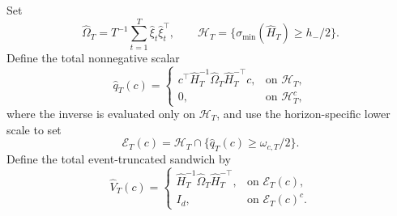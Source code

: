 Set
\[
 \widehat\Omega_T=T^{-1}\sum_{t=1}^T\widehat\xi_t\widehat\xi_t^\top,
 \qquad
 \mathcal H_T=\{\sigma_{\min}(\widehat H_T)\ge h_-/2\}.
\]
Define the total nonnegative scalar
\[
 \widehat q_T(c)=
 \begin{cases}
 c^\top\widehat H_T^{-1}\widehat\Omega_T\widehat H_T^{-\top}c,
   &\text{on }\mathcal H_T,\\
 0,&\text{on }\mathcal H_T^c,
 \end{cases}
\]
where the inverse is evaluated only on \(\mathcal H_T\), and use the horizon-specific lower scale to set
\[
 \mathcal E_T(c)=\mathcal H_T\cap\{\widehat q_T(c)\ge\omega_{c,T}/2\}.
\]
Define the total event-truncated sandwich by
\[
 \widehat V_T(c)=
 \begin{cases}
 \widehat H_T^{-1}\widehat\Omega_T\widehat H_T^{-\top},
   &\text{on }\mathcal E_T(c),\\
 I_d,&\text{on }\mathcal E_T(c)^c.
 \end{cases}
\]